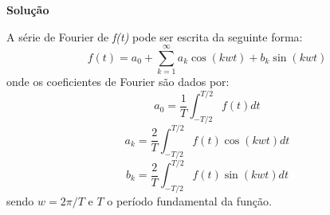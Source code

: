 \linespread{1.5}
\textbf{Solução}

A série de Fourier de \textit{f(t)} pode ser escrita da seguinte forma:
\begin{equation}
    \label{eq:Fourierserie}
    f(t) = a_0 + \sum_{k=1}^\infty a_k\cos{(kwt)} + b_k\sin{(kwt)}
\end{equation}
onde os coeficientes de Fourier são dados por:
\begin{equation}
    a_0 = \frac{1}{T}\int_{-T/2}^{T/2}f(t)dt
\end{equation}
\begin{equation}
    a_k = \frac{2}{T}\int_{-T/2}^{T/2}f(t)\cos{(kwt)}dt
\end{equation}
\begin{equation}
    b_k = \frac{2}{T}\int_{-T/2}^{T/2}f(t)\sin{(kwt)}dt
\end{equation}
sendo $w = 2\pi / T$ e $T$ o período fundamental da função.

